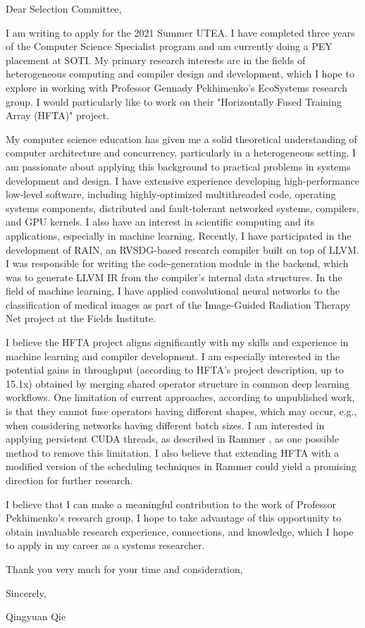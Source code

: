 \documentclass[11pt]{article}
\begin{document}
\setlength{\parindent}{0em}
\setlength{\parskip}{1em}
\noindent
Dear Selection Committee,

\vspace{5mm}

I am writing to apply for the 2021 Summer UTEA. I have completed three years of the Computer Science Specialist program and am currently doing a PEY placement at SOTI. My primary research interests are in the fields of heterogeneous computing and compiler design and development, which I hope to explore in working with Professor Gennady Pekhimenko's EcoSystems research group. I would particularly like to work on their "Horizontally Fused Training Array (HFTA)" project.

My computer science education has given me a solid theoretical understanding of computer architecture and concurrency, particularly in a heterogeneous setting. I am passionate about applying this background to practical problems in systems development and design. I have extensive experience developing high-performance low-level software, including highly-optimized multithreaded code, operating systems components, distributed and fault-tolerant networked systems, compilers, and GPU kernels. I also have an interest in scientific computing and its applications, especially in machine learning. Recently, I have participated in the development of RAIN, an RVSDG-based research compiler built on top of LLVM. I was responsible for writing the code-generation module in the backend, which was to generate LLVM IR from the compiler's internal data structures. In the field of machine learning, I have applied convolutional neural networks to the classification of medical images as part of the Image-Guided Radiation Therapy Net project at the Fields Institute.

I believe the HFTA project aligns significantly with my skills and experience in machine learning and compiler development. I am especially interested in the potential gains in throughput (according to HFTA's project description, up to 15.1x) obtained by merging shared operator structure in common deep learning workflows. One limitation of current approaches, according to unpublished work, is that they cannot fuse operators having different shapes, which may occur, e.g., when considering networks having different batch sizes. I am interested in applying persistent CUDA threads, as described in Rammer \cite{rammer}, as one possible method to remove this limitation. I also believe that extending HFTA with a modified version of the scheduling techniques in Rammer could yield a promising direction for further research.

I believe that I can make a meaningful contribution to the work of Professor Pekhimenko's research group. I hope to take advantage of this opportunity to obtain invaluable research experience, connections, and knowledge, which I hope to apply in my career as a systems researcher.

\vspace{5mm}
\noindent
Thank you very much for your time and consideration,

\vspace{5mm}
\noindent
Sincerely,

\noindent
Qingyuan Qie

\printbibliography
\end{document}
